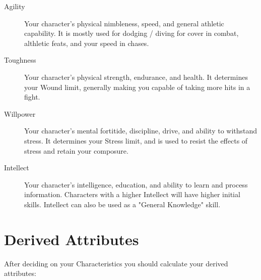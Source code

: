 \begin{description}
    \item[Agility] 
    Your character's physical nimbleness, speed, and general athletic capability.
    It is mostly used for dodging / diving for cover in combat, althletic feats, and your speed in chases.

    \item[Toughness] 
    Your character's physical strength, endurance, and health.
    It determines your Wound limit, generally making you capable of taking more hits in a fight.

    \item[Willpower]
    Your character's mental fortitide, discipline, drive, and ability to withstand stress.
    It determines your Stress limit, and is used to resist the effects of stress and retain your composure.
    
    \item[Intellect]
    Your character's intelligence, education, and ability to learn and process information.
    Characters with a higher Intellect will have higher initial skills. 
    Intellect can also be used as a "General Knowledge" skill.
\end{description}


\section{Derived Attributes}

After deciding on your Characteristics you should calculate your derived attributes:


